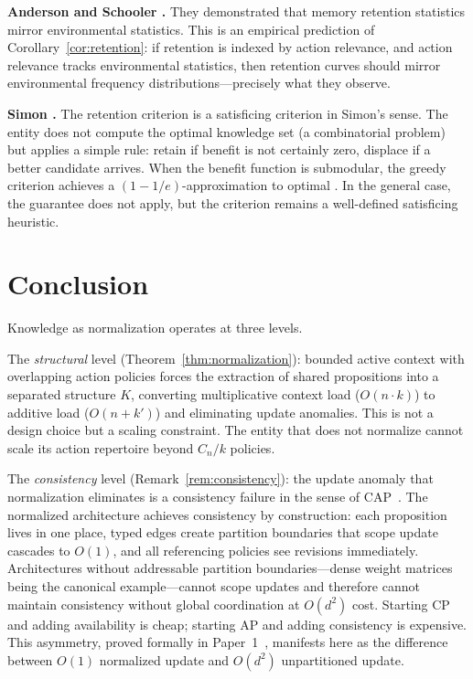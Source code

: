 \documentclass[11pt]{article}
\theoremstyle{definition}
\theoremstyle{remark}
\begin{document}
\textbf{Anderson and Schooler \cite{AndersonSchooler1991}.}
They demonstrated that memory retention statistics mirror environmental
statistics. This is an empirical prediction of
Corollary~\ref{cor:retention}: if retention is indexed by action
relevance, and action relevance tracks environmental statistics, then
retention curves should mirror environmental frequency
distributions---precisely what they observe.

\textbf{Simon \cite{Simon1955}.}
The retention criterion is a satisficing criterion in Simon's sense.
The entity does not compute the optimal knowledge set (a combinatorial
problem) but applies a simple rule: retain if benefit is not certainly
zero, displace if a better candidate arrives. When the benefit function
is submodular, the greedy criterion achieves a $(1 - 1/e)$-approximation
to optimal \cite{Nemhauser1978}. In the general case, the guarantee does
not apply, but the criterion remains a well-defined satisficing
heuristic.

\section{Conclusion}
\label{sec:conclusion}

Knowledge as normalization operates at three levels.

The \emph{structural} level (Theorem~\ref{thm:normalization}):
bounded active context with overlapping action policies forces the
extraction of shared propositions into a separated structure $K$,
converting multiplicative context load ($O(n \cdot k)$) to additive
load ($O(n + k')$) and eliminating update anomalies. This is not a
design choice but a scaling constraint. The entity that does not
normalize cannot scale its action repertoire beyond $C_n / k$ policies.

The \emph{consistency} level (Remark~\ref{rem:consistency}):
the update anomaly that normalization eliminates is a consistency
failure in the sense of CAP~\cite{Brewer2000, Gilbert2002}. The
normalized architecture achieves consistency by construction: each
proposition lives in one place, typed edges create partition
boundaries that scope update cascades to $O(1)$, and all referencing
policies see revisions immediately. Architectures without addressable
partition boundaries---dense weight matrices being the canonical
example---cannot scope updates and therefore cannot maintain consistency
without global coordination at $O(d^2)$ cost. Starting CP and adding
availability is cheap; starting AP and adding consistency is expensive.
This asymmetry, proved formally in Paper~1~\cite{McCarthy2026a},
manifests here as the difference between $O(1)$ normalized update and
$O(d^2)$ unpartitioned update.
\end{document}
